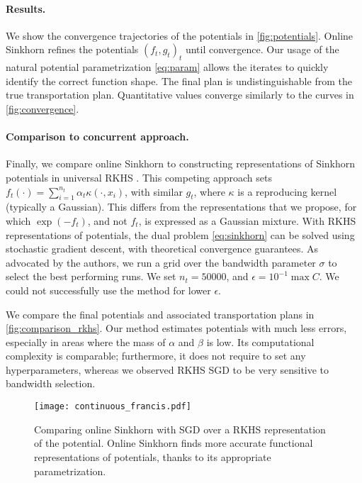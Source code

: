 \paragraph{Results.} We show the convergence trajectories of the potentials in
\autoref{fig:potentials}. Online Sinkhorn refines the potentials $(f_t, g_t)_t$ until convergence. Our usage of the natural potential parametrization \eqref{eq:param}
allows the iterates to quickly identify the correct function shape. The final
plan is undistinguishable from the true transportation plan. Quantitative values
converge similarly to the curves in \autoref{fig:convergence}.

\paragraph{Comparison to concurrent approach.} Finally, we compare online
Sinkhorn to constructing representations of Sinkhorn potentials in universal
RKHS \cite{2016-genevay-nips}. This competing approach sets $f_t(\cdot) =
\sum_{i=1}^{n_t} \alpha_t \kappa(\cdot, x_i)$, with similar $g_t$, where $\kappa$ is
a reproducing kernel (typically a Gaussian). This differs from the
representations that we propose, for which $\exp(-f_t)$, and not $f_t$, is
expressed as a Gaussian mixture. With RKHS representations of potentials, the
dual problem \eqref{eq:sinkhorn} can be solved using stochastic gradient
descent, with theoretical convergence guarantees. As advocated by the authors,
we run a grid over the bandwidth parameter $\sigma$ to select the best
performing runs. We set $n_t = 50000$, and $\epsilon = 10^{-1} \max C$. We could not successfully use the method for lower $\epsilon$.

We compare the final potentials and associated
transportation plans in \autoref{fig:comparison_rkhs}. Our method estimates
potentials with much less errors, especially in areas where the mass of $\alpha$
and $\beta$ is low. Its computational complexity is comparable; furthermore, it
does not require to set any hyperparameters, whereas we observed RKHS SGD to be
very sensitive to bandwidth selection.

\begin{figure}[t]
    \centering
    \texttt{[image: continuous\_francis.pdf]}
    \caption{Comparing online Sinkhorn with SGD over a RKHS representation of the potential. Online Sinkhorn finds more accurate functional representations of potentials, thanks to its appropriate parametrization.}
    \label{fig:comparison_rkhs}
\end{figure}